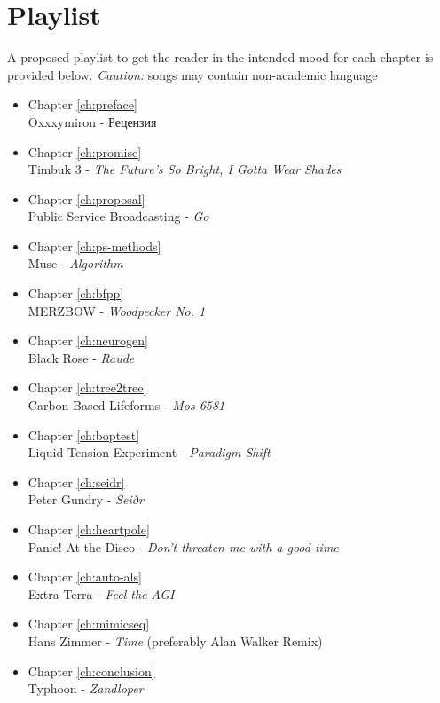 \chapter{Playlist}
\label{apdx:playlist}

A proposed playlist to get the reader in the intended mood for each chapter is provided below.
\emph{Caution:} songs may contain non-academic language

\begin{itemize}
    \item Chapter \ref{ch:preface}  \\ Oxxxymiron - \foreignlanguage{russian}{Рецензия}
    \item Chapter \ref{ch:promise}  \\ Timbuk 3 - \emph{The Future's So Bright, I Gotta Wear Shades}
    \item Chapter \ref{ch:proposal}  \\ Public Service Broadcasting - \emph{Go}
    \item Chapter \ref{ch:ps-methods}  \\ Muse - \emph{Algorithm}
    \item Chapter \ref{ch:bfpp}  \\ MERZBOW - \emph{Woodpecker No. 1} 
    \item Chapter \ref{ch:neurogen}  \\ Black Rose - \emph{Raude}
    \item Chapter \ref{ch:tree2tree}  \\ Carbon Based Lifeforms - \emph{Mos 6581}
    \item Chapter \ref{ch:boptest}  \\ Liquid Tension Experiment - \emph{Paradigm Shift}
    \item Chapter \ref{ch:seidr}  \\ Peter Gundry - \emph{Seiðr}
    \item Chapter \ref{ch:heartpole}  \\ Panic! At the Disco - \emph{Don't threaten me with a good time}
    \item Chapter \ref{ch:auto-als}  \\ Extra Terra - \emph{Feel the AGI} 
    \item Chapter \ref{ch:mimicseq}  \\ Hans Zimmer - \emph{Time} (preferably Alan Walker Remix)
    \item Chapter \ref{ch:conclusion}  \\ Typhoon - \emph{Zandloper}
\end{itemize}